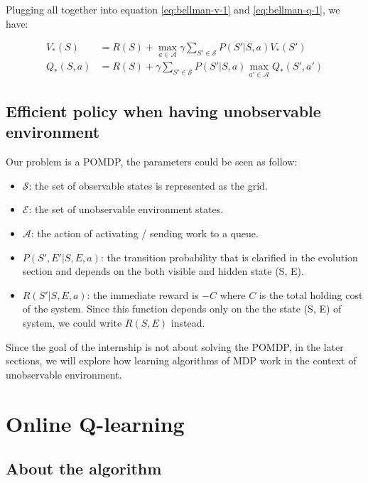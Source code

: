 \documentclass[
  a4paper, xcolor = usenames,dvipsnames]{article}
\providecommand{\tightlist}{%
  \setlength{\itemsep}{0pt}\setlength{\parskip}{0pt}}
\theoremstyle{definition}
\theoremstyle{definition}
\theoremstyle{definition}
\theoremstyle{definition}
\theoremstyle{remark}
\begin{document}
Plugging all together into equation \eqref{eq:bellman-v-1} and \eqref{eq:bellman-q-1}, we have:

\begin{align}
V_{*}(S) &= R(S) + \max_{a \in \mathcal{A}} \gamma \sum_{S' \in \mathcal{S}} P(S' | S, a) V_{*}(S')
\label{eq:bellman-max-v} \\
Q_{*}(S, a) &= R(S) + \gamma \sum_{S' \in \mathcal{S}} P(S' | S, a) \max_{a' \in \mathcal{A}} Q_{*}(S', a')
\label{eq:bellman-max-q}
\end{align}

\hypertarget{efficient-policy-when-having-unobservable-environment}{%
\subsection{Efficient policy when having unobservable environment}\label{efficient-policy-when-having-unobservable-environment}}

Our problem is a POMDP, the parameters could be seen as follow:

\begin{itemize}
\tightlist
\item
  \(\mathcal{S}\): the set of observable states is represented as the grid.
\item
  \(\mathcal{E}\): the set of unobservable environment states.
\item
  \(\mathcal{A}\): the action of activating / sending work to a queue.
\item
  \(P(S', E' | S, E, a)\): the transition probability that is clarified in the evolution section and depends on the both visible and hidden state (S, E).
\item
  \(R(S' | S, E, a)\): the immediate reward is \(-C\) where \(C\) is the total holding cost of the system. Since this function depends only on the the state (S, E) of system, we could write \(R(S, E)\) instead.
\end{itemize}

Since the goal of the internship is not about solving the POMDP, in the later sections, we will explore how learning algorithms of MDP work in the context of unobservable environment.

\hypertarget{online-q-learning}{%
\section{Online Q-learning}\label{online-q-learning}}

\hypertarget{about-the-algorithm}{%
\subsection{About the algorithm}\label{about-the-algorithm}}
\end{document}
